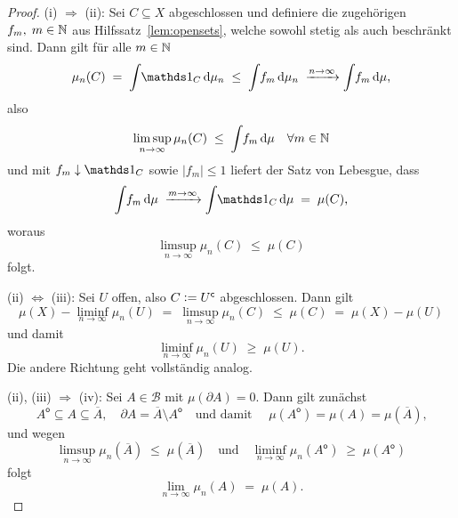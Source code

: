 \documentclass[../main/main.tex]{subfiles}
\begin{document}
	\begin{proof}
		(i) $\Rightarrow$ (ii): Sei $C \subseteq X$ abgeschlossen und definiere die zugehörigen $f_m, \; m \in \mathbb{N}$ aus Hilfssatz~\ref{lem:opensets}, welche sowohl stetig als auch beschränkt sind.
		Dann gilt für alle $m \in \mathbb{N}$
		$$\mu_n(C) \; = \; \measureint{}{\indfct_C}{\mu_n} \; \leq \; \measureint{}{f_m}{\mu_n} \; \xrightarrow{n \to \infty} \measureint{}{f_m}{\mu} \text{,}$$
		also 
		$$\limsup_{n \to \infty} \mu_n(C) \; \leq \; \int_{} \, f_m \, \mathrm{d}\mu \quad \forall m \in \mathbb{N}$$
		und mit $f_m \convdown \indfct_C$ sowie $| f_m | \leq 1$ liefert der Satz von Lebesgue, dass
		$$\measureint{}{f_m}{\mu} \; \xrightarrow{m \to \infty} \measureint{}{\indfct_C}{\mu} \; = \; \mu(C) \text{,}$$
		woraus
		$$\limsup_{n \to \infty} \mu_n(C) \; \leq \; \mu(C)$$
		folgt.
		
		(ii) $\Leftrightarrow$ (iii): Sei $U$ offen, also $C \vcentcolon = U^\mathsf{c}$ abgeschlossen. Dann gilt
		$$\mu(X) - \liminf_{n \to \infty} \mu_n(U) \; = \; \limsup_{n \to \infty} \mu_n(C) \; \leq \; \mu(C) \; = \; \mu(X) - \mu(U)$$
		und damit 
		$$\liminf_{n \to \infty} \mu_n(U) \; \geq \; \mu(U) \text{.}$$
		Die andere Richtung geht vollständig analog.
		
		(ii), (iii) $\Rightarrow$ (iv): Sei $A \in \mathcal{B}$ mit $\mu(\partial A) = 0$. Dann gilt zunächst
		$$A^\mathsf{o} \subseteq A \subseteq \overline{A}, \quad \partial A = \overline{A} \setminus A^\mathsf{o} \quad \text{und damit } \quad \mu(A^\mathsf{o}) = \mu(A) = \mu(\overline{A}) \text{,}$$
		und wegen 
		$$\limsup_{n \to \infty} \mu_n(\overline{A}) \; \leq \; \mu(\overline{A}) \quad \text{und} \quad \liminf_{n \to \infty} \mu_n(A^\mathsf{o}) \; \geq \; \mu(A^\mathsf{o})$$
		folgt
		$$\lim_{n \to \infty} \mu_n(A) \; = \; \mu(A) \text{.}$$
		

\end{proof}
\end{document}
